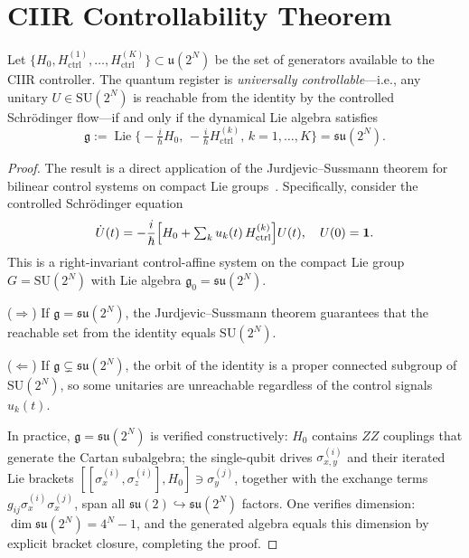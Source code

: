 \section{CIIR Controllability Theorem}
\label{sec:ch21-controllability}

\begin{theorem}\label{thm:controllability}
Let $\{H_0, H_{\mathrm{ctrl}}^{(1)},\dots,H_{\mathrm{ctrl}}^{(K)}\}
\subset \mathfrak{u}(2^N)$ be the set of generators available to the
CIIR controller.  The quantum register is \emph{universally
controllable}---i.e., any unitary $U \in \mathrm{SU}(2^N)$ is
reachable from the identity by the controlled Schr\"odinger flow---if
and only if the dynamical Lie algebra satisfies
\begin{equation}\label{eq:lie-closure}
  \mathfrak{g}
  := \operatorname{Lie}\!\bigl\{
       -\tfrac{i}{\hbar}H_0,\,
       -\tfrac{i}{\hbar}H_{\mathrm{ctrl}}^{(k)},\,
       k = 1,\dots,K
     \bigr\}
  = \mathfrak{su}(2^N).
\end{equation}
\end{theorem}

\begin{proof}
The result is a direct application of the Jurdjevic--Sussmann theorem
for bilinear control systems on compact Lie groups~\cite{JS1972}.
Specifically, consider the controlled Schr\"odinger equation
\begin{equation}\label{eq:schrodinger-ctrl}
  \dot{U}(t) = -\frac{i}{\hbar}
    \Bigl[H_0 + \textstyle\sum_k u_k(t)\,H_{\mathrm{ctrl}}^{(k)}\Bigr]
    U(t),
  \quad U(0) = \mathbf{1}.
\end{equation}
This is a right-invariant control-affine system on the compact Lie group
$G = \mathrm{SU}(2^N)$ with Lie algebra $\mathfrak{g}_0 = \mathfrak{su}(2^N)$.

\medskip\noindent
($\Rightarrow$) If $\mathfrak{g} = \mathfrak{su}(2^N)$, the
Jurdjevic--Sussmann theorem guarantees that the reachable set from the
identity equals $\mathrm{SU}(2^N)$.

\medskip\noindent
($\Leftarrow$) If $\mathfrak{g} \subsetneq \mathfrak{su}(2^N)$, the
orbit of the identity is a proper connected subgroup of $\mathrm{SU}(2^N)$,
so some unitaries are unreachable regardless of the control signals
$u_k(t)$.

\medskip\noindent
In practice, $\mathfrak{g} = \mathfrak{su}(2^N)$ is verified
constructively: $H_0$ contains $ZZ$ couplings that generate the
Cartan subalgebra; the single-qubit drives $\sigma_{x,y}^{(i)}$ and
their iterated Lie brackets
$[[\sigma_x^{(i)}, \sigma_z^{(i)}], H_0] \ni \sigma_y^{(j)}$, together
with the exchange terms $g_{ij}\sigma_x^{(i)}\sigma_x^{(j)}$, span all
$\mathfrak{su}(2) \hookrightarrow \mathfrak{su}(2^N)$ factors.  One
verifies dimension: $\dim \mathfrak{su}(2^N) = 4^N - 1$, and the
generated algebra equals this dimension by explicit bracket closure,
completing the proof.
\end{proof}


